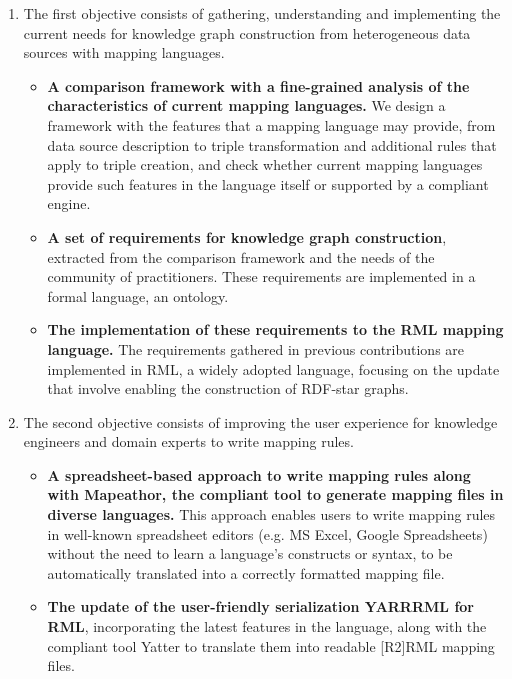 \begin{enumerate}
    \item The first objective consists of gathering, understanding and implementing the current needs for knowledge graph construction from heterogeneous data sources with mapping languages. 

    \begin{itemize}
        \item \textbf{A comparison framework with a fine-grained analysis of the characteristics of current mapping languages.} We design a framework with the features that a mapping language may provide, from data source description to triple transformation and additional rules that apply to triple creation, and check whether current mapping languages provide such features in the language itself or supported by a compliant engine. 

        \item \textbf{A set of requirements for knowledge graph construction}, extracted from the comparison framework and the needs of the community of practitioners. These requirements are implemented in a formal language, an ontology. 

        \item \textbf{The implementation of these requirements to the RML mapping language.} The requirements gathered in previous contributions are implemented in RML, a widely adopted language, focusing on the update that involve enabling the construction of RDF-star graphs.
    \end{itemize}

    \item The second objective consists of improving the user experience for knowledge engineers and domain experts to write mapping rules.

    \begin{itemize}
        \item \textbf{A spreadsheet-based approach to write mapping rules along with Mapeathor, the compliant tool to generate mapping files in diverse languages.} This approach enables users to write mapping rules in well-known spreadsheet editors (e.g. MS Excel, Google Spreadsheets) without the need to learn a language's constructs or syntax, to be automatically translated into a correctly formatted mapping file. 

        \item \textbf{The update of the user-friendly serialization YARRRML for RML}, incorporating the latest features in the language, along with the compliant tool Yatter to translate them into readable [R2]RML mapping files. 
    \end{itemize}


\end{enumerate}
